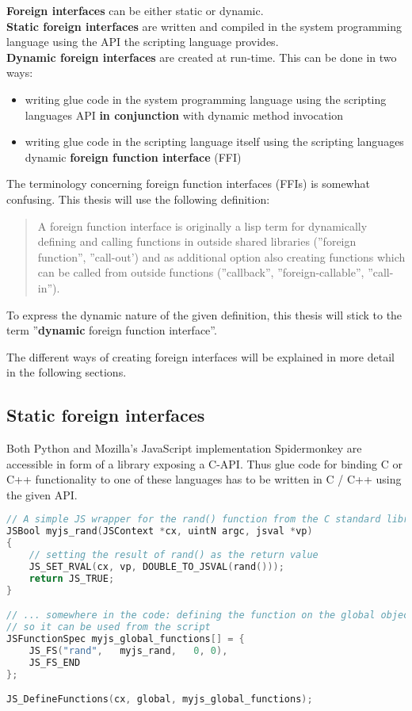 \textbf{Foreign interfaces} can be either static or dynamic.\\
\textbf{Static foreign interfaces} are written and compiled in the system programming language using the API the scripting language provides.\\
\textbf{Dynamic foreign interfaces} are created at run-time. This can be done in two ways:
\begin{itemize}
\item writing glue code in the system programming language using the scripting languages API \textbf{in conjunction} with dynamic method invocation
\item writing glue code in the scripting language itself using the scripting languages dynamic \textbf{foreign function interface} (FFI)
\end{itemize}

The terminology concerning foreign function interfaces (FFIs) is somewhat confusing. This thesis will use the following definition:

\begin{quotation}
A foreign function interface is originally a lisp term for dynamically defining and calling functions in outside shared libraries (''foreign function'', ''call-out') and as additional option also creating functions which can be called from outside functions (''callback'', ''foreign-callable'', ''call-in'').
\end{quotation}

To express the dynamic nature of the given definition, this thesis will stick to the term ''\textbf{dynamic} foreign function interface''.

The different ways of creating foreign interfaces will be explained in more detail in the following sections.

\newpage
\subsection{Static foreign interfaces}

Both Python and Mozilla's JavaScript implementation Spidermonkey are accessible in form of a library exposing a C-API. Thus glue code for binding C or C++ functionality to one of these languages has to be written in C / C++ using the given API.

\begin{lstlisting}[language=C++, caption=Exposing a C function to Spidermonkey (taken from MDN)]
// A simple JS wrapper for the rand() function from the C standard library
JSBool myjs_rand(JSContext *cx, uintN argc, jsval *vp)
{
    // setting the result of rand() as the return value
    JS_SET_RVAL(cx, vp, DOUBLE_TO_JSVAL(rand()));
    return JS_TRUE;
}

// ... somewhere in the code: defining the function on the global object
// so it can be used from the script
JSFunctionSpec myjs_global_functions[] = {
    JS_FS("rand",   myjs_rand,   0, 0),
    JS_FS_END
};

JS_DefineFunctions(cx, global, myjs_global_functions);
\end{lstlisting}

